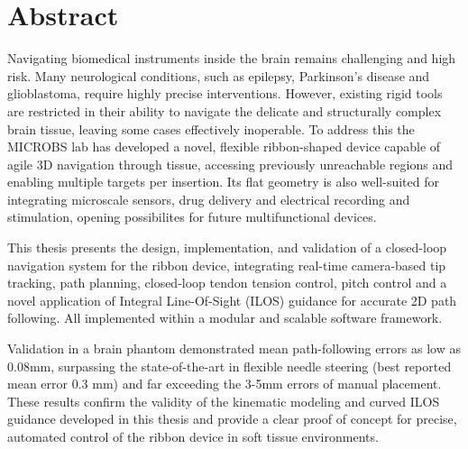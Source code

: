 


\section*{Abstract}
Navigating biomedical instruments inside the brain remains challenging and high risk. Many neurological conditions, such as epilepsy, Parkinson's disease and glioblastoma, require highly precise interventions. However, existing rigid tools are restricted in their ability to navigate the delicate and structurally complex brain tissue, leaving some cases effectively inoperable. To address this the MICROBS lab has developed a novel, flexible ribbon-shaped device capable of agile 3D navigation through tissue, accessing previously unreachable regions and enabling multiple targets per insertion. Its flat geometry is also well-suited for integrating microscale sensors, drug delivery and electrical recording and stimulation, opening possibilites for future multifunctional devices. 

This thesis presents the design, implementation, and validation of a closed-loop navigation system for the ribbon device, integrating real-time camera-based tip tracking, path planning, closed-loop tendon tension control, pitch control and a novel application of Integral Line-Of-Sight (ILOS) guidance for accurate 2D path following. All implemented within a modular and scalable software framework.

Validation in a brain phantom demonstrated mean path-following errors as low as 0.08mm, surpassing the state-of-the-art in flexible needle steering (best reported mean error 0.3 mm) and far exceeding the 3-5mm errors of manual placement. These results confirm the validity of the kinematic modeling and curved ILOS guidance developed in this thesis and provide a clear proof of concept for precise, automated control of the ribbon device in soft tissue environments. 
